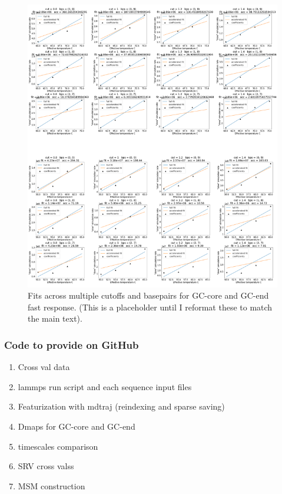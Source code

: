 \documentclass[journal=jpcbfk,manuscript=article]{achemso}
\begin{document}
\begin{figure}[ht!]
	\begin{center}
        \includegraphics[width=\textwidth]{Figs/figs_0804/relaxation_core_and_end_allcuts.PNG}
        \caption{Fits across multiple cutoffs and basepairs for GC-core and GC-end fast response. (This is a placeholder until I reformat these to match the main text).}
        \label{fig:relaxation_core_and_end_allcuts}
	\end{center}
\end{figure}


\subsubsection{\label{sec:Results}Code to provide on GitHub} 
\begin{enumerate}
    \item Cross val data
    \item lammps run script and each sequence input files
    \item Featurization with mdtraj (reindexing and sparse saving)
    \item Dmaps for GC-core and GC-end
    \item timescales comparison
    \item SRV cross valss
    \item MSM construction
\end{enumerate}
\end{document}
